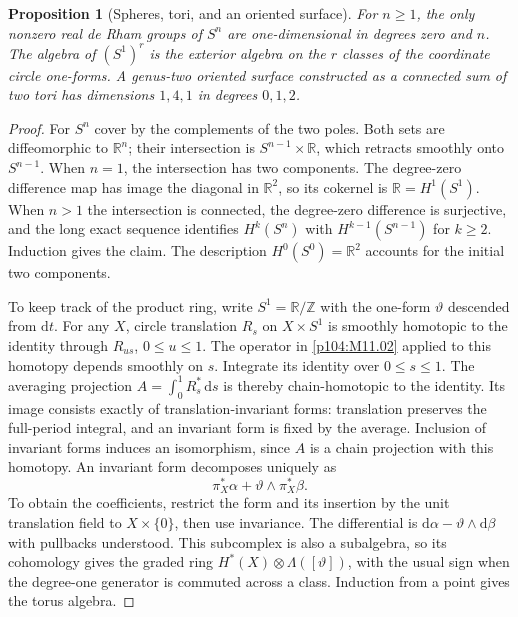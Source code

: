 \documentclass[11pt,oneside,openany]{book}
\newtheorem{proposition}[theorem]{Proposition}
\theoremstyle{definition}
\theoremstyle{remark}
\newcommand{\R}{\mathbb R}
\newcommand{\dd}{\mathrm d}
\begin{document}
\begin{proposition}[Spheres, tori, and an oriented surface]
\label{p104:M11.04}
For \(n\geq1\), the only nonzero real de Rham groups of \(S^n\)
are one-dimensional in degrees zero and \(n\). The algebra of
\((S^1)^r\) is the exterior algebra on the \(r\) classes of the
coordinate circle one-forms. A genus-two oriented surface
constructed as a connected sum of two tori has dimensions
\(1,4,1\) in degrees \(0,1,2\).
\end{proposition}
\begin{proof}
For \(S^n\) cover by the complements of the two poles. Both
sets are diffeomorphic to \(\R^n\); their intersection is
\(S^{n-1}\times\R\), which retracts smoothly onto \(S^{n-1}\).
When \(n=1\), the intersection has two components. The
degree-zero difference map has image the diagonal in
\(\R^2\), so its cokernel is \(\R=H^1(S^1)\).
When \(n>1\) the intersection is connected, the degree-zero
difference is surjective, and the long exact sequence
identifies \(H^k(S^n)\) with \(H^{k-1}(S^{n-1})\) for \(k\geq2\).
Induction gives the claim. The description \(H^0(S^0)=\R^2\)
accounts for the initial two components.

To keep track of the product ring, write \(S^1=\R/\mathbb Z\)
with the one-form \(\vartheta\) descended from \(\dd t\).
For any \(X\), circle translation \(R_s\) on \(X\times S^1\)
is smoothly homotopic to the identity through \(R_{us}\),
\(0\leq u\leq1\). The operator in \cref{p104:M11.02} applied
to this homotopy depends smoothly on \(s\). Integrate its
identity over \(0\leq s\leq1\). The averaging projection
\(A=\int_0^1 R_s^*\,\dd s\) is thereby chain-homotopic to the
identity. Its image consists exactly of translation-invariant
forms: translation preserves the full-period integral, and
an invariant form is fixed by the average. Inclusion of
invariant forms induces an isomorphism, since \(A\) is a
chain projection with this homotopy. An invariant form
decomposes uniquely as
\[
       \pi_X^*\alpha+\vartheta\wedge\pi_X^*\beta .
\]
To obtain the coefficients, restrict the form and its insertion
by the unit translation field to \(X\times\{0\}\), then use
invariance. The differential is \(\dd\alpha-\vartheta\wedge \dd\beta\)
with pullbacks understood. This subcomplex is also a subalgebra,
so its cohomology gives the graded ring \(H^*(X)\otimes
\Lambda([\vartheta])\), with the usual sign when the degree-one
generator is commuted across a class. Induction from a point
gives the torus algebra.


\end{proof}
\end{document}
